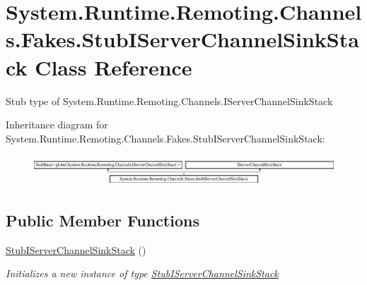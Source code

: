 \hypertarget{class_system_1_1_runtime_1_1_remoting_1_1_channels_1_1_fakes_1_1_stub_i_server_channel_sink_stack}{\section{System.\-Runtime.\-Remoting.\-Channels.\-Fakes.\-Stub\-I\-Server\-Channel\-Sink\-Stack Class Reference}
\label{class_system_1_1_runtime_1_1_remoting_1_1_channels_1_1_fakes_1_1_stub_i_server_channel_sink_stack}
}


Stub type of System.\-Runtime.\-Remoting.\-Channels.\-I\-Server\-Channel\-Sink\-Stack 


Inheritance diagram for System.\-Runtime.\-Remoting.\-Channels.\-Fakes.\-Stub\-I\-Server\-Channel\-Sink\-Stack\-:\begin{figure}[H]
\begin{center}
\leavevmode
\includegraphics[height=1.159420cm]{class_system_1_1_runtime_1_1_remoting_1_1_channels_1_1_fakes_1_1_stub_i_server_channel_sink_stack}
\end{center}
\end{figure}
\subsection*{Public Member Functions}
\begin{DoxyCompactItemize}
\item 
\hyperlink{class_system_1_1_runtime_1_1_remoting_1_1_channels_1_1_fakes_1_1_stub_i_server_channel_sink_stack_a4e84a15df46ce1b53eb91df3f3911e96}{Stub\-I\-Server\-Channel\-Sink\-Stack} ()
\begin{DoxyCompactList}\small\item\em Initializes a new instance of type \hyperlink{class_system_1_1_runtime_1_1_remoting_1_1_channels_1_1_fakes_1_1_stub_i_server_channel_sink_stack}{Stub\-I\-Server\-Channel\-Sink\-Stack}\end{DoxyCompactList}\end{DoxyCompactItemize}
